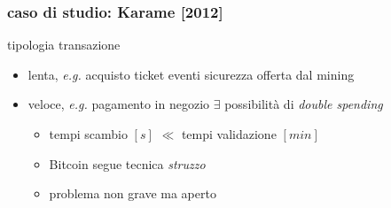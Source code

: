 \begin{frame}
	\frametitle{caso di studio: Karame [2012]}

	tipologia transazione
	\begin{itemize}
	  \item lenta, \textit{e.g.} acquisto ticket eventi
	  		\vspace{2pt}
	  		\newline sicurezza offerta dal mining
	  \vspace{5pt}
	  \item {\color{blue}veloce}, \textit{e.g.} pagamento in negozio
	  		\vspace{2pt}
	  		\newline $\exists$ possibilità di \textit{double spending}
	  		\begin{itemize}
	  			\item tempi scambio $[s]$ $\ll$ tempi validazione $[min]$
	  			\item Bitcoin segue tecnica \textit{struzzo}
	  			\item problema non grave ma aperto
	  		\end{itemize}
	\end{itemize}

\end{frame}
% 	
% 
